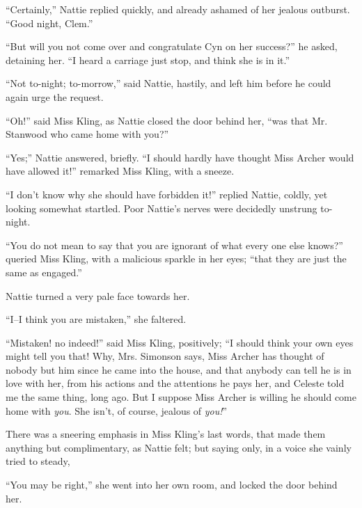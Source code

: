 ``Certainly,'' Nattie replied quickly, and already ashamed of her jealous
outburst. ``Good night, Clem.''

``But will you not come over and congratulate Cyn on her success?'' he
asked, detaining her. ``I heard a carriage just stop, and think she is in
it.''

``Not to-night; to-morrow,'' said Nattie, hastily, and left him before he
could again urge the request.

``Oh!'' said Miss Kling, as Nattie closed the door behind her, ``was that
Mr. Stanwood who came home with you?''

``Yes;'' Nattie answered, briefly. ``I should hardly have thought Miss
Archer would have allowed it!'' remarked Miss Kling, with a sneeze.

``I don't know why she should have forbidden it!'' replied Nattie, coldly,
yet looking somewhat startled. Poor Nattie's nerves were decidedly
unstrung to-night.

``You do not mean to say that you are ignorant of what every one else
knows?'' queried Miss Kling, with a malicious sparkle in her eyes; ``that
they are just the same as engaged.''

Nattie turned a very pale face towards her.

``I--I think you are mistaken,'' she faltered.

``Mistaken! no indeed!'' said Miss Kling, positively; ``I should think your
own eyes might tell you that! Why, Mrs. Simonson says, Miss Archer has
thought of nobody but him since he came into the house, and that anybody
can tell he is in love with her, from his actions and the attentions he
pays her, and Celeste told me the same thing, long ago. But I suppose
Miss Archer is willing he should come home with \emph{you}. She isn't, of
course, jealous of \emph{you!}''

There was a sneering emphasis in Miss Kling's last words, that made them
anything but complimentary, as Nattie felt; but saying only, in a voice
she vainly tried to steady,

``You may be right,'' she went into her own room, and locked the door
behind her.

